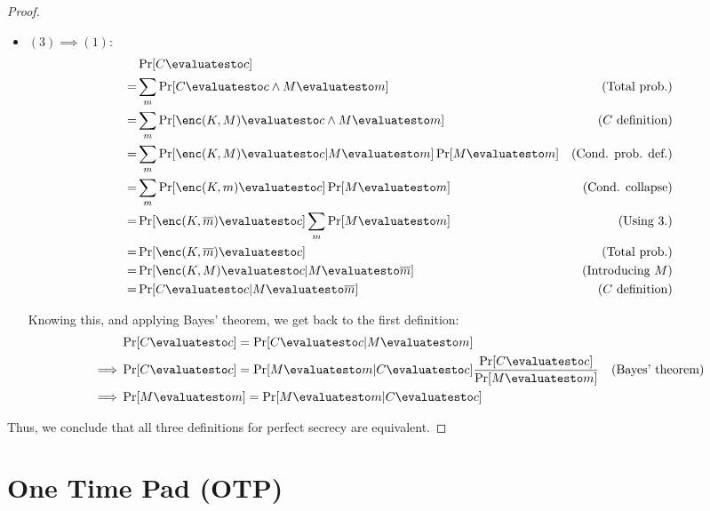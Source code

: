 \begin{proof}
\begin{itemize}
        \item $(3) \implies (1)$:
        \begin{align*}
            & \Pr[C \evaluatesto c] & \\
            =& \sum_{m}\Pr[C \evaluatesto c \wedge M \evaluatesto m] & \text{(Total prob.)} \\
            =& \sum_{m}\Pr[\enc(K, M) \evaluatesto c \wedge M \evaluatesto m] & \text{($C$ definition)} \\
            =& \sum_{m}\Pr[\enc(K, M) \evaluatesto c|M \evaluatesto m]\Pr[M \evaluatesto m] & \text{(Cond. prob. def.)} \\
            =& \sum_{m}\Pr[\enc(K, m) \evaluatesto c]\Pr[M \evaluatesto m] & \text{(Cond. collapse)} \\
            =& \Pr[\enc(K, \overline{m}) \evaluatesto c] \sum_{m}\Pr[M \evaluatesto m] & \text{(Using 3.)} \\ %
            =& \Pr[\enc(K, \overline{m}) \evaluatesto c] & \text{(Total prob.)} \\
            =& \Pr[\enc(K, M) \evaluatesto c|M \evaluatesto \overline{m}] & \text{(Introducing $M$)} \\
            =& \Pr[C \evaluatesto c|M \evaluatesto \overline{m}] & \text{($C$ definition)}
        \end{align*}

        Knowing this, and applying Bayes' theorem, we get back to the first definition:
        \begin{align*}
            & \Pr[C \evaluatesto c] = \Pr[C \evaluatesto c|M \evaluatesto m] & \\
            \implies& \Pr[C \evaluatesto c] = \Pr[M \evaluatesto m|C \evaluatesto c]\frac{\Pr[C \evaluatesto c]}{\Pr[M \evaluatesto m]} & \text{(Bayes' theorem)} \\
            \implies& \Pr[M \evaluatesto m] = \Pr[M \evaluatesto m|C \evaluatesto c] &
        \end{align*}

    \end{itemize}

    Thus, we conclude that all three definitions for perfect secrecy are equivalent.

\end{proof}

\section{One Time Pad (OTP)}

